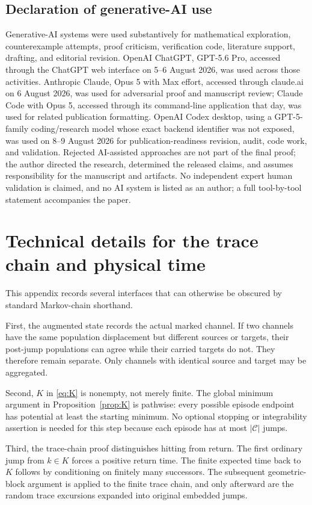 \subsection*{Declaration of generative-AI use}
Generative-AI systems were used substantively for mathematical exploration,
counterexample attempts, proof criticism, verification code, literature
support, drafting, and editorial revision.  OpenAI ChatGPT, GPT-5.6 Pro,
accessed through the ChatGPT web interface on 5--6 August 2026, was used across
those activities.  Anthropic Claude, Opus 5 with Max effort, accessed through
claude.ai on 6 August 2026, was used for adversarial proof and manuscript
review; Claude Code with Opus 5, accessed through its command-line application
that day, was used for related publication formatting.  OpenAI Codex desktop,
using a GPT-5-family coding/research model whose exact backend identifier was
not exposed, was used on 8--9 August 2026 for publication-readiness revision,
audit, code work, and validation.  Rejected AI-assisted approaches are not
part of the final proof; the author directed the research, determined the
released claims, and assumes responsibility for the manuscript and artifacts.
No independent expert human validation is claimed, and no AI system is listed
as an author; a full tool-by-tool statement accompanies the paper.

\appendix
\section{Technical details for the trace chain and physical time}\label{app:trace}

This appendix records several interfaces that can otherwise be obscured by
standard Markov-chain shorthand.

First, the augmented state records the actual marked channel.  If two
channels have the same population displacement but different sources or
targets, their post-jump populations can agree while their carried targets do
not.  They therefore remain separate.  Only channels with identical source
and target may be aggregated.

Second, \(K\) in \eqref{eq:K} is nonempty, not merely finite.  The global
minimum argument in Proposition~\ref{prop:K} is pathwise: every possible
episode endpoint has potential at least the starting minimum.  No optional
stopping or integrability assertion is needed for this step because each
episode has at most \(|\mathcal C|\) jumps.

Third, the trace-chain proof distinguishes hitting from return.  The first
ordinary jump from \(k\in K\) forces a positive return time.  The finite
expected time back to \(K\) follows by conditioning on finitely many
successors.  The subsequent geometric-block argument is applied to the
finite trace chain, and only afterward are the random trace excursions
expanded into original embedded jumps.

